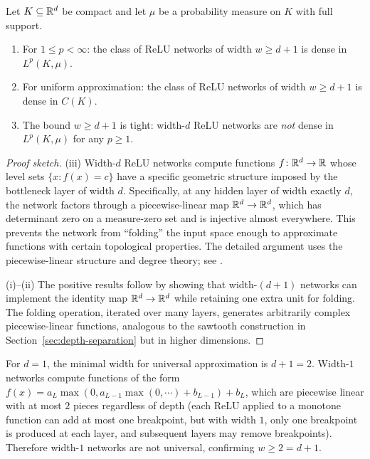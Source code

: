 \documentclass[11pt,a4paper]{article}
\begin{document}
\begin{theorem}
\label{thm:hanin}
Let $K \subseteq \mathbb{R}^d$ be compact and let $\mu$ be a probability
measure on $K$ with full support.
\begin{enumerate}[nosep,label=(\roman*)]
  \item For $1 \le p < \infty$: the class of ReLU networks of width
    $w \ge d + 1$ is dense in $L^p(K, \mu)$.
  \item For uniform approximation: the class of ReLU networks of width
    $w \ge d + 1$ is dense in $C(K)$.
  \item The bound $w \ge d + 1$ is tight: width-$d$ ReLU networks
    are \emph{not} dense in $L^p(K, \mu)$ for any $p \ge 1$.
\end{enumerate}
\end{theorem}

\begin{proof}[Proof sketch]
(iii) Width-$d$ ReLU networks compute functions $f \colon \mathbb{R}^d \to \mathbb{R}$
whose level sets $\{x : f(x) = c\}$ have a specific geometric
structure imposed by the bottleneck layer of width $d$.  Specifically,
at any hidden layer of width exactly $d$, the network factors through
a piecewise-linear map $\mathbb{R}^d \to \mathbb{R}^d$, which has determinant zero on
a measure-zero set and is injective almost everywhere.  This prevents
the network from ``folding'' the input space enough to approximate
functions with certain topological properties.  The detailed argument
uses the piecewise-linear structure and degree theory; see
\citet{hanin2019}.

(i)--(ii) The positive results follow by showing that width-$(d+1)$
networks can implement the identity map $\mathbb{R}^d \to \mathbb{R}^d$ while
retaining one extra unit for folding.  The folding operation, iterated
over many layers, generates arbitrarily complex piecewise-linear
functions, analogous to the sawtooth construction in
Section~\ref{sec:depth-separation} but in higher dimensions.
\end{proof}

\begin{example}
\label{ex:minimal-width-1d}
For $d = 1$, the minimal width for universal approximation is
$d + 1 = 2$.  Width-$1$ networks compute functions of the form
$f(x) = a_L \max(0, a_{L-1} \max(0, \cdots) + b_{L-1}) + b_L$, which
are piecewise linear with at most $2$ pieces regardless of depth (each
ReLU applied to a monotone function can add at most one breakpoint, but
with width $1$, only one breakpoint is produced at each layer, and
subsequent layers may remove breakpoints).  Therefore width-$1$ networks
are not universal, confirming $w \ge 2 = d + 1$.
\end{example}
\end{document}
